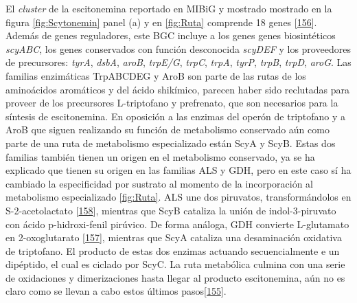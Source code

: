\documentclass[12pt,twoside]{reedthesis}
\begin{document}
  El \emph{cluster} de la escitonemina reportado en MIBiG y mostrado
  mostrado en la figura \autoref{fig:Scytonemin} panel (a) y en
  \autoref{fig:Ruta} comprende 18 genes
  {[}\protect\hyperlink{ref-soule_comparative_2009}{156}{]}. Además de
  genes reguladores, este BGC incluye a los genes genes biosintéticos
  \emph{scyABC}, los genes conservados con función desconocida
  \emph{scyDEF} y los proveedores de precursores: \emph{tyrA},
  \emph{dsbA}, \emph{aroB}, \emph{trpE/G}, \emph{trpC}, \emph{trpA},
  \emph{tyrP}, \emph{trpB}, \emph{trpD}, \emph{aroG}. Las familias
  enzimáticas TrpABCDEG y AroB son parte de las rutas de los aminoácidos
  aromáticos y del ácido shikímico, parecen haber sido reclutadas para
  proveer de los precursores L-triptofano y prefrenato, que son necesarios
  para la síntesis de escitonemina. En oposición a las enzimas del operón
  de triptofano y a AroB que siguen realizando su función de metabolismo
  conservado aún como parte de una ruta de metabolismo especializado están
  ScyA y ScyB. Estas dos familias también tienen un origen en el
  metabolismo conservado, ya se ha explicado que tienen su origen en las
  familias ALS y GDH, pero en este caso sí ha cambiado la especificidad
  por sustrato al momento de la incorporación al metabolismo especializado
  \autoref{fig:Ruta}. ALS une dos piruvatos, transformándolos en
  S-2-acetolactato
  {[}\protect\hyperlink{ref-liu_acetohydroxyacid_2016}{158}{]}, mientras
  que ScyB cataliza la unión de indol-3-piruvato con ácido p-hidroxi-fenil
  pirúvico. De forma análoga, GDH convierte L-glutamato en 2-oxoglutarato
  {[}\protect\hyperlink{ref-engel_glutamate_2014}{157}{]}, mientras que
  ScyA cataliza una desaminación oxidativa de triptofano. El producto de
  estas dos enzimas actuando secuencialmente e un dipéptido, el cual es
  ciclado por ScyC. La ruta metabólica culmina con una serie de
  oxidaciones y dimerizaciones hasta llegar al producto escitonemina, aún
  no es claro como se llevan a cabo estos últimos
  pasos{[}\protect\hyperlink{ref-balskus_investigating_2008}{155}{]}.
  
\end{document}
